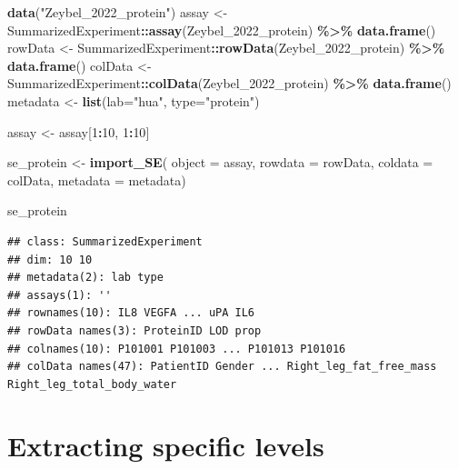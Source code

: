 \documentclass[
]{book}
\newenvironment{Shaded}{\begin{snugshade}}{\end{snugshade}}
\newcommand{\AttributeTok}[1]{\textcolor[rgb]{0.13,0.29,0.53}{#1}}
\newcommand{\DecValTok}[1]{\textcolor[rgb]{0.00,0.00,0.81}{#1}}
\newcommand{\FunctionTok}[1]{\textcolor[rgb]{0.13,0.29,0.53}{\textbf{#1}}}
\newcommand{\NormalTok}[1]{#1}
\newcommand{\OtherTok}[1]{\textcolor[rgb]{0.56,0.35,0.01}{#1}}
\newcommand{\SpecialCharTok}[1]{\textcolor[rgb]{0.81,0.36,0.00}{\textbf{#1}}}
\newcommand{\StringTok}[1]{\textcolor[rgb]{0.31,0.60,0.02}{#1}}
\begin{document}
\begin{Shaded}
\begin{Highlighting}[]
\FunctionTok{data}\NormalTok{(}\StringTok{"Zeybel\_2022\_protein"}\NormalTok{)}
\NormalTok{assay }\OtherTok{\textless{}{-}}\NormalTok{ SummarizedExperiment}\SpecialCharTok{::}\FunctionTok{assay}\NormalTok{(Zeybel\_2022\_protein) }\SpecialCharTok{\%\textgreater{}\%}
  \FunctionTok{data.frame}\NormalTok{()}
\NormalTok{rowData }\OtherTok{\textless{}{-}}\NormalTok{ SummarizedExperiment}\SpecialCharTok{::}\FunctionTok{rowData}\NormalTok{(Zeybel\_2022\_protein) }\SpecialCharTok{\%\textgreater{}\%}
  \FunctionTok{data.frame}\NormalTok{()}
\NormalTok{colData }\OtherTok{\textless{}{-}}\NormalTok{ SummarizedExperiment}\SpecialCharTok{::}\FunctionTok{colData}\NormalTok{(Zeybel\_2022\_protein) }\SpecialCharTok{\%\textgreater{}\%}
  \FunctionTok{data.frame}\NormalTok{()}
\NormalTok{metadata }\OtherTok{\textless{}{-}} \FunctionTok{list}\NormalTok{(}\AttributeTok{lab=}\StringTok{"hua"}\NormalTok{, }\AttributeTok{type=}\StringTok{"protein"}\NormalTok{)}

\NormalTok{assay }\OtherTok{\textless{}{-}}\NormalTok{ assay[}\DecValTok{1}\SpecialCharTok{:}\DecValTok{10}\NormalTok{, }\DecValTok{1}\SpecialCharTok{:}\DecValTok{10}\NormalTok{]}

\NormalTok{se\_protein }\OtherTok{\textless{}{-}} \FunctionTok{import\_SE}\NormalTok{(}
    \AttributeTok{object =}\NormalTok{ assay,}
    \AttributeTok{rowdata =}\NormalTok{ rowData,}
    \AttributeTok{coldata =}\NormalTok{ colData,}
    \AttributeTok{metadata =}\NormalTok{ metadata)}

\NormalTok{se\_protein}
\end{Highlighting}
\end{Shaded}

\begin{verbatim}
## class: SummarizedExperiment 
## dim: 10 10 
## metadata(2): lab type
## assays(1): ''
## rownames(10): IL8 VEGFA ... uPA IL6
## rowData names(3): ProteinID LOD prop
## colnames(10): P101001 P101003 ... P101013 P101016
## colData names(47): PatientID Gender ... Right_leg_fat_free_mass Right_leg_total_body_water
\end{verbatim}

\hypertarget{extracting-specific-levels}{%
\section{Extracting specific levels}\label{extracting-specific-levels}}
\end{document}
